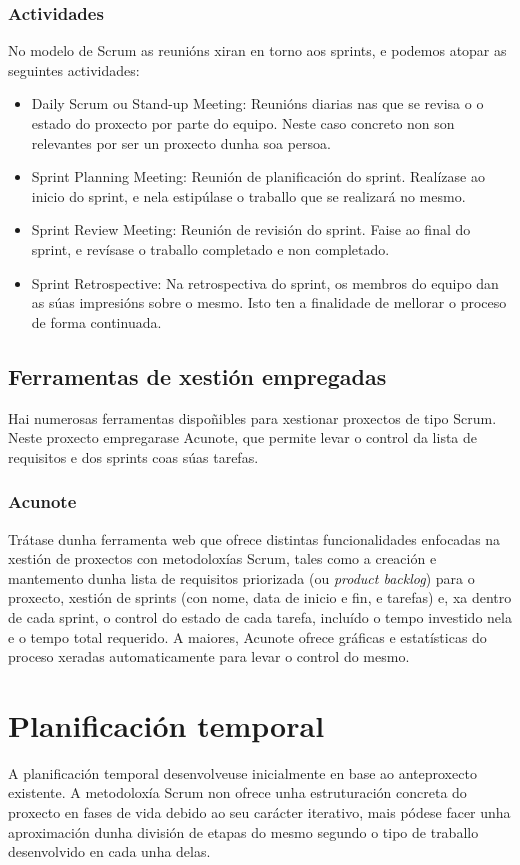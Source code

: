 \subsubsection{Actividades}
No modelo de Scrum as reunións xiran en torno aos sprints, e podemos atopar as
seguintes actividades:
\begin{itemize}
  \item Daily Scrum ou Stand-up Meeting: Reunións diarias nas que se revisa o
  o estado do proxecto por parte do equipo. Neste caso concreto non son
  relevantes por ser un proxecto dunha soa persoa.
  \item Sprint Planning Meeting: Reunión de planificación do sprint. Realízase
  ao inicio do sprint, e nela estipúlase o traballo que se realizará no mesmo.
  \item Sprint Review Meeting: Reunión de revisión do sprint. Faise ao final do
  sprint, e revísase o traballo completado e non completado.
  \item Sprint Retrospective: Na retrospectiva do sprint, os membros do equipo
  dan as súas impresións sobre o mesmo. Isto ten a finalidade de mellorar o
  proceso de forma continuada.
\end{itemize}

\subsection{Ferramentas de xestión empregadas}
Hai numerosas ferramentas dispoñibles para xestionar proxectos de tipo Scrum.
Neste proxecto empregarase Acunote, que permite levar o control da lista de
requisitos e dos sprints coas súas tarefas.

\subsubsection{Acunote}
Trátase dunha ferramenta web que ofrece distintas funcionalidades enfocadas na
xestión de proxectos con metodoloxías Scrum, tales como a creación e mantemento
dunha lista de requisitos priorizada (ou {\it product backlog}) para o proxecto,
xestión de sprints (con nome, data de inicio e fin, e tarefas) e, xa dentro de
cada sprint, o control do estado de cada tarefa, incluído o tempo investido nela
e o tempo total requerido. A maiores, Acunote ofrece gráficas e estatísticas do
proceso xeradas automaticamente para levar o control do mesmo.

\section{Planificación temporal}
A planificación temporal desenvolveuse inicialmente en base ao anteproxecto
existente. A metodoloxía Scrum non ofrece unha estruturación concreta do
proxecto en fases de vida debido ao seu carácter iterativo, mais pódese facer
unha aproximación dunha división de etapas do mesmo segundo o tipo de traballo
desenvolvido en cada unha delas.

